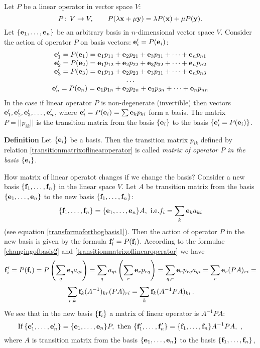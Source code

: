 \documentclass[12pt]{article}
\numberwithin{equation}{section}
\begin{document}
Let $P$ be a linear operator in vector space $V$:
              \begin{equation*}
 P\colon \, V\to V,\qquad P(\lambda {\bf x}+\mu {\bf y})=\lambda P({\bf x})+\mu P({\bf y}).
              \end{equation*}
Let $\{{\bf e}_1,\dots,{\bf e}_n\}$ be an arbitrary  basis in $n$-dimensional vector space $V$.
Consider the action of operator $P$ on basis vectors: ${\bf e}'_i=P({\bf e}_i)$:
                \begin{equation}\label{transitionmatrixoflinearoperator}
                  \begin{matrix}
 {\bf e}'_1=P({\bf e}_1)={\bf e}_1 p_{11}+{\bf e}_2 p_{21}+{\bf e}_3 p_{31}+\dots+{\bf e}_n p_{n1}\cr
 {\bf e}'_2 =P({\bf e}_2)={\bf e}_1 p_{12}+{\bf e}_2 p_{22}+{\bf e}_3 p_{32}+\dots+{\bf e}_n p_{n2}\cr
 {\bf e}'_3 =P({\bf e}_3)={\bf e}_1 p_{13}+{\bf e}_2 p_{23}+{\bf e}_3 p_{31}+\dots+{\bf e}_n p_{n3}\cr
     \ldots\cr
  {\bf e}'_n = P({\bf e}_n)={\bf e}_1 p_{1n}+{\bf e}_2 p_{2n}+{\bf e}_3 p_{3n}+\dots+{\bf e}_n p_{nn}\cr                         \end{matrix}
                 \end{equation}
   In the case if linear operator $P$ is non-degenerate (invertible) then
  vectors  ${{\bf e}'_1,{\bf e}'_2,{\bf e}'_3,\dots,{\bf e}'_n}$,
 where ${\bf e}'_i=P({\bf e}_i)=\sum {\bf e}_kp_{ki}$ form a basis.
  The matrix $P=||p_{ik}||$ is the transition matrix
from the basis $\{{\bf e}_i\}$ to the basis $\{{\bf e}'_i=P({\bf e}_i)\}$. 

{\bf Definition}  Let $\{{\bf e}_i\}$ be a basis. Then the 
transition matrix $p_{ik}$ defined by 
relation \eqref{transitionmatrixoflinearoperator} 
 is called {\it matrix of operator $P$ in the basis $\{{\bf e}_i\}$.}

\smallskip
   How matrix of linear operatot changes if we change the basis?
    Consider a new basis $\{{\bf f}_1,\dots,{\bf f}_n\}$ in the linear space $V$.
  Let $A$ be transition matrix from the basis $\{{\bf e}_1,\dots,{\bf e}_n\}$
to the new basis $\{{\bf f}_1,\dots,{\bf f}_n\}$:
               \begin{equation*}\label{changingofbasis2}
\{{\bf f}_1,\dots,{\bf f}_n\}=\{{\bf e}_1,\dots,{\bf e}_n\}A,\,\,{\rm i.e.}
      f_i=\sum_k{\bf e}_k a_{ki}
               \end{equation*}
 (see equation \eqref{transformoforthogbasis1}).
Then the action of operator $P$ in the new basis is given by the formula
       ${\bf f}'_i=P({\bf f}_i)$. According to the formulae \eqref{changingofbasis2} and
\eqref{transitionmatrixoflinearoperator} we have
          $$
   {\bf f}'_i=P({\bf f}_i)=P\left(\sum_q{\bf e}_q a_{qi}\right)=
     \sum_q a_{qi}\left(\sum_r{\bf e}_r p_{rq}\right)=
     \sum_{q,r}{\bf e}_r p_{rq}a_{qi}=\sum_{r}{\bf e}_r (PA)_{ri}=
         $$
         $$
    \sum_{r,k}{\bf f}_{k}(A^{-1})_{kr}(PA)_{ri}=\sum_k {\bf f}_k(A^{-1}PA)_{ki}\,.
      $$
We see that in the new basis $\{{\bf f}_i\}$
a matrix of linear operator is $A^{-1}PA$:
         \begin{equation}\label{changingoftransitionmatrix}
{\rm If\,}
  \{{\bf e}'_1,\dots,{\bf e}'_n\}=\{{\bf e}_1,\dots,{\bf e}_n\}P,\,\,
{\rm then\,\,}
  \{{\bf f}'_1,\dots,{\bf f}'_n\}=\{{\bf f}_1,\dots,{\bf f}_n\}A^{-1}PA,\,\,,
      \end{equation}
where $A$ is transition matrix from the basis $\{{\bf e}_1,\dots,{\bf e}_n\}$
to the basis $\{{\bf f}_1,\dots,{\bf f}_n\}$,
\end{document}
